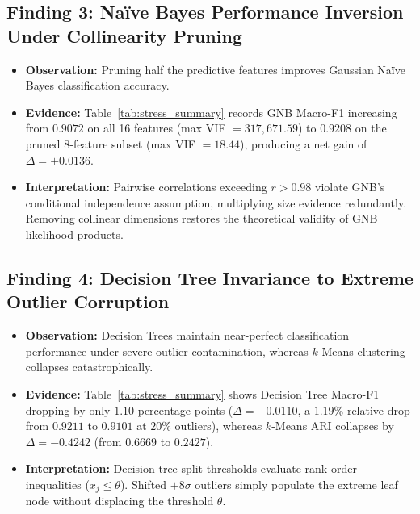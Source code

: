 \documentclass[11pt,a4paper]{article}
\begin{document}
\subsection{Finding 3: Naïve Bayes Performance Inversion Under Collinearity Pruning}
\begin{itemize}[leftmargin=1.5em]
    \item \textbf{Observation:} Pruning half the predictive features improves Gaussian Naïve Bayes classification accuracy.
    \item \textbf{Evidence:} Table~\ref{tab:stress_summary} records GNB Macro-F1 increasing from $0.9072$ on all 16 features (max VIF $= 317{,}671.59$) to $\mathbf{0.9208}$ on the pruned 8-feature subset (max VIF $= 18.44$), producing a net gain of $\Delta = +0.0136$.
    \item \textbf{Interpretation:} Pairwise correlations exceeding $r > 0.98$ violate GNB's conditional independence assumption, multiplying size evidence redundantly. Removing collinear dimensions restores the theoretical validity of GNB likelihood products.
\end{itemize}

\subsection{Finding 4: Decision Tree Invariance to Extreme Outlier Corruption}
\begin{itemize}[leftmargin=1.5em]
    \item \textbf{Observation:} Decision Trees maintain near-perfect classification performance under severe outlier contamination, whereas $k$-Means clustering collapses catastrophically.
    \item \textbf{Evidence:} Table~\ref{tab:stress_summary} shows Decision Tree Macro-F1 dropping by only $1.10$ percentage points ($\Delta = -0.0110$, a $1.19\%$ relative drop from $0.9211$ to $0.9101$ at $20\%$ outliers), whereas $k$-Means ARI collapses by $\Delta = -0.4242$ (from $0.6669$ to $0.2427$).
    \item \textbf{Interpretation:} Decision tree split thresholds evaluate rank-order inequalities ($x_j \le \theta$). Shifted $+8\sigma$ outliers simply populate the extreme leaf node without displacing the threshold $\theta$.
\end{itemize}
\end{document}
